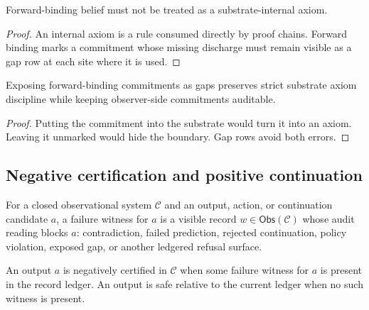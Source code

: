 \begin{corollary}
\label{cor:philosophy-forward-binding-not-substrate-axiom}
Forward-binding belief must not be treated as a substrate-internal
axiom.
\end{corollary}
\begin{proof}
An internal axiom is a rule consumed directly by proof chains. Forward
binding marks a commitment whose missing discharge must remain visible
as a gap row at each site where it is used.
\end{proof}

\begin{corollary}
\label{cor:philosophy-gap-preserves-axiom-discipline}
Exposing forward-binding commitments as gaps preserves strict
substrate axiom discipline while keeping observer-side commitments
auditable.
\end{corollary}
\begin{proof}
Putting the commitment into the substrate would turn it into an axiom.
Leaving it unmarked would hide the boundary. Gap rows avoid both
errors.
\end{proof}

\subsection{Negative certification and positive continuation}
\label{subsec:philosophy-negative-certification-positive-continuation}

\begin{definition}
\label{def:philosophy-failure-witness}
For a closed observational system $\mathcal C$ and an output, action,
or continuation candidate $a$, a failure witness for $a$ is a visible
record $w\in\mathsf{Obs}(\mathcal C)$ whose audit reading blocks $a$:
contradiction, failed prediction, rejected continuation, policy
violation, exposed gap, or another ledgered refusal surface.
\end{definition}

\begin{definition}
\label{def:philosophy-negative-certification}
An output $a$ is negatively certified in $\mathcal C$ when some failure
witness for $a$ is present in the record ledger. An output is safe
relative to the current ledger when no such witness is present.
\end{definition}

